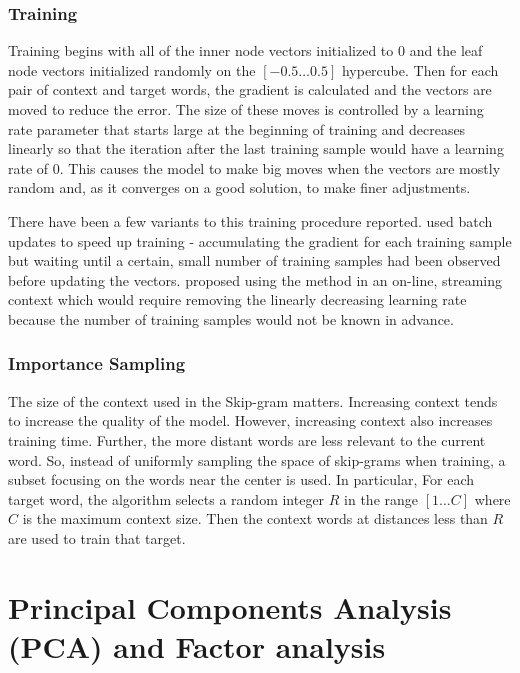 \subsubsection{Training}

Training begins with all of the inner node vectors initialized to 0 and the 
leaf node vectors initialized randomly on the $[-0.5\ldots0.5]$ hypercube. Then
for each pair of context and target words, the gradient is calculated and the 
vectors are moved to reduce the error. The size of these moves is controlled 
by a learning rate parameter that starts large at the beginning of training and
decreases linearly so that the iteration after the last training sample would
have a learning rate of 0. This causes the model to make big moves when the 
vectors are mostly random and, as it converges on a good solution, to make finer
adjustments.

There have been a few variants to this training procedure reported. 
\citep{Wolf} used batch updates to speed up training - accumulating the gradient
for each training sample but waiting until a certain, small number of training 
samples had been observed before updating the vectors. \citep{Perozzi2014}
proposed using the method in an on-line, streaming context which would require
removing the linearly decreasing learning rate because the number of training
samples would not be known in advance.

\subsubsection{Importance Sampling}

The size of the context used in the Skip-gram matters. Increasing context tends
to increase the quality of the model. However, increasing context also increases
training time. Further, the more distant words are less relevant to the current
word. So, instead of uniformly sampling the space of skip-grams when training,
a subset focusing on the words near the center is used. In particular, For each
target word, the algorithm selects a random integer $R$ in the range 
$[1\ldots{}C]$ where $C$ is the maximum context size. Then the context words 
at distances less than $R$ are used to train that target. 

\section{Principal Components Analysis (PCA) and Factor analysis}

